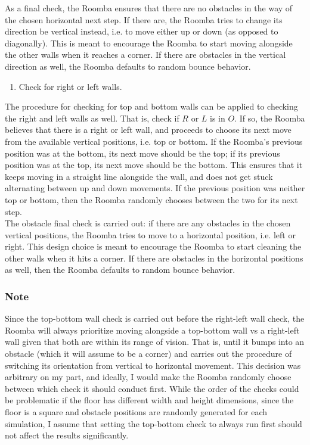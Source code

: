 \documentclass[11pt]{article}
\providecommand{\tightlist}{%
      \setlength{\itemsep}{0pt}\setlength{\parskip}{0pt}}
\begin{document}
As a final check, the Roomba ensures that there are no obstacles in the
way of the chosen horizontal next step. If there are, the Roomba tries
to change its direction be vertical instead, i.e. to move either up or
down (as opposed to diagonally). This is meant to encourage the Roomba
to start moving alongside the other walls when it reaches a corner. If
there are obstacles in the vertical direction as well, the Roomba
defaults to random bounce behavior.

\begin{enumerate}
\def\labelenumi{\arabic{enumi})}
\setcounter{enumi}{1}
\tightlist
\item
  Check for right or left walls.
\end{enumerate}

The procedure for checking for top and bottom walls can be applied to
checking the right and left walls as well. That is, check if \(R\) or
\(L\) is in \(O\). If so, the Roomba believes that there is a right or
left wall, and proceeds to choose its next move from the available
vertical positions, i.e. top or bottom. If the Roomba's previous
position was at the bottom, its next move should be the top; if its
previous position was at the top, its next move should be the bottom.
This ensures that it keeps moving in a straight line alongside the wall,
and does not get stuck alternating between up and down movements. If the
previous position was neither top or bottom, then the Roomba randomly
chooses between the two for its next step.\\

The obstacle final check is carried out: if there are any obstacles in
the chosen vertical positions, the Roomba tries to move to a horizontal
position, i.e. left or right. This design choice is meant to encourage
the Roomba to start cleaning the other walls when it hits a corner. If
there are obstacles in the horizontal positions as well, then the Roomba
defaults to random bounce behavior.

\subsubsection{Note}

Since the top-bottom wall check is carried out before the right-left
wall check, the Roomba will always prioritize moving alongside a
top-bottom wall vs a right-left wall given that both are within its
range of vision. That is, until it bumps into an obstacle (which it will
assume to be a corner) and carries out the procedure of switching its
orientation from vertical to horizontal movement. This decision was arbitrary on my part, and ideally, I would make the
Roomba randomly choose between which check it should conduct first.
While the order of the checks could be problematic if the floor has
different width and height dimensions, since the floor is a square and
obstacle positions are randomly generated for each simulation, I assume
that setting the top-bottom check to always run first should not affect
the results significantly.
\newpage
\end{document}
